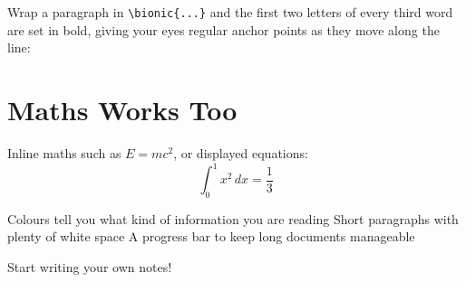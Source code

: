 \documentclass[english]{morandi-adhd}
\begin{document}
Wrap a paragraph in \verb|\bionic{...}| and the first two letters of every third word are
set in bold, giving your eyes regular anchor points as they move along the line:




\section{Maths Works Too}

Inline maths such as $E = mc^2$, or displayed equations:
\[
  \int_0^1 x^2 \, dx = \frac{1}{3}
\]

\begin{summary}
  \begin{checklist}
    \done Colours tell you what kind of information you are reading
    \done Short paragraphs with plenty of white space
    \done A progress bar to keep long documents manageable
    \item Start writing your own notes!
  \end{checklist}
\end{summary}
\end{document}
